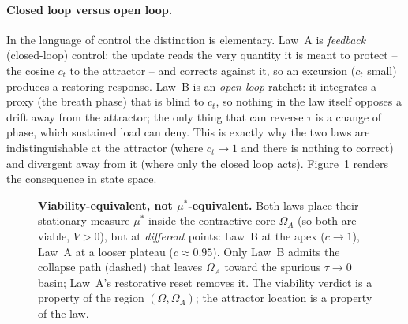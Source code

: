 \documentclass[11pt, a4paper]{article}
\begin{document}
\paragraph{Closed loop versus open loop.}
In the language of control the distinction is elementary. Law~A is
\emph{feedback} (closed-loop) control: the update reads the very quantity it is
meant to protect -- the cosine $c_t$ to the attractor -- and corrects against it,
so an excursion ($c_t$ small) produces a restoring response. Law~B is an
\emph{open-loop} ratchet: it integrates a proxy (the breath phase) that is blind
to $c_t$, so nothing in the law itself opposes a drift away from the attractor;
the only thing that can reverse $\tau$ is a change of phase, which sustained load
can deny. This is exactly why the two laws are indistinguishable at the attractor
(where $c_t\to1$ and there is nothing to correct) and divergent away from it
(where only the closed loop acts). Figure~\ref{fig:trustlaw_geom} renders the
consequence in state space.

\begin{figure}[!htb]
\centering
{}
\caption{\textbf{Viability-equivalent, not $\mu^*$-equivalent.} Both laws place
their stationary measure $\mu^*$ inside the contractive core $\Omega_A$ (so both
are viable, $V>0$), but at \emph{different} points: Law~B at the apex ($c\to1$),
Law~A at a looser plateau ($c\approx0.95$). Only Law~B admits the collapse path
(dashed) that leaves $\Omega_A$ toward the spurious $\tau\to0$ basin; Law~A's
restorative reset removes it. The viability verdict is a property of the region
$(\Omega,\Omega_A)$; the attractor location is a property of the law.}
\label{fig:trustlaw_geom}
\end{figure}
\end{document}
